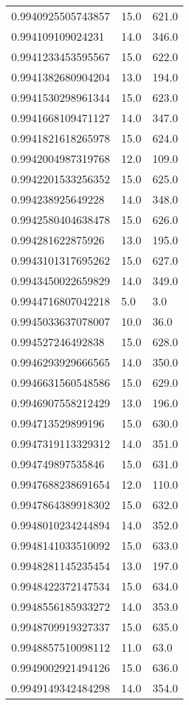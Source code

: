 \begin{center}
\begin{supertabular}[H]{p{0.30\textwidth}p{0.05\textwidth}p{0.05\textwidth}}
0.9940925505743857 & 15.0 & 621.0 \\ 
0.994109109024231 & 14.0 & 346.0 \\ 
0.9941233453595567 & 15.0 & 622.0 \\ 
0.9941382680904204 & 13.0 & 194.0 \\ 
0.9941530298961344 & 15.0 & 623.0 \\ 
0.9941668109471127 & 14.0 & 347.0 \\ 
0.9941821618265978 & 15.0 & 624.0 \\ 
0.9942004987319768 & 12.0 & 109.0 \\ 
0.9942201533256352 & 15.0 & 625.0 \\ 
0.994238925649228 & 14.0 & 348.0 \\ 
0.9942580404638478 & 15.0 & 626.0 \\ 
0.994281622875926 & 13.0 & 195.0 \\ 
0.9943101317695262 & 15.0 & 627.0 \\ 
0.9943450022659829 & 14.0 & 349.0 \\ 
0.9944716807042218 & 5.0 & 3.0 \\ 
0.9945033637078007 & 10.0 & 36.0 \\ 
0.994527246492838 & 15.0 & 628.0 \\ 
0.9946293929666565 & 14.0 & 350.0 \\ 
0.9946631560548586 & 15.0 & 629.0 \\ 
0.9946907558212429 & 13.0 & 196.0 \\ 
0.994713529899196 & 15.0 & 630.0 \\ 
0.9947319113329312 & 14.0 & 351.0 \\ 
0.994749897535846 & 15.0 & 631.0 \\ 
0.9947688238691654 & 12.0 & 110.0 \\ 
0.9947864389918302 & 15.0 & 632.0 \\ 
0.9948010234244894 & 14.0 & 352.0 \\ 
0.9948141033510092 & 15.0 & 633.0 \\ 
0.9948281145235454 & 13.0 & 197.0 \\ 
0.9948422372147534 & 15.0 & 634.0 \\ 
0.9948556185933272 & 14.0 & 353.0 \\ 
0.9948709919327337 & 15.0 & 635.0 \\ 
0.9948857510098112 & 11.0 & 63.0 \\ 
0.9949002921494126 & 15.0 & 636.0 \\ 
0.9949149342484298 & 14.0 & 354.0 \\ 

\end{supertabular}
\end{center}
